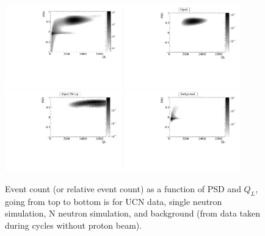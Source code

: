 \documentclass[review]{elsarticle}
\begin{document}
\begin{figure}[!htpb]
\centering
\includegraphics[width=0.45\textwidth]{figures/2DGrayscale.pdf}
\includegraphics[width=0.45\textwidth]{figures/hsig_psdql.pdf}
\includegraphics[width=0.45\textwidth]{figures/hsigpile_psdql.pdf}
\includegraphics[width=0.45\textwidth]{figures/hbg_psdql.pdf}
\caption{ Event count (or relative event count) as a function of PSD
  and $Q_L$, going from top to bottom is for UCN data,
  single neutron simulation, N neutron simulation, and background (from
  data taken during cycles without proton beam).} \label{fig:eventSpectra}
\end{figure}
\end{document}
